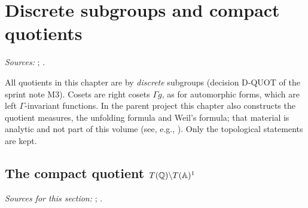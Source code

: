 
\chapter{Discrete subgroups and compact quotients}\label{ch:ch-0-07-quotient}

\noindent\emph{Sources:} \cite[§1]{AIntro}; \cite[§1]{A-R1}.

\noindent All quotients in this chapter are by \emph{discrete} subgroups (decision D-QUOT of the sprint note M3). Cosets are right
cosets $\Gamma g$, as for automorphic forms, which are left $\Gamma$-invariant functions. In the parent project this chapter also
constructs the quotient measures, the unfolding formula and Weil's formula; that material is analytic and not part of this volume
(see, e.g., \cite[§1]{AIntro}). Only the topological statements are kept.

\section{\texorpdfstring{The compact quotient $T(\mathbb{Q})\backslash T(\mathbb{A})^1$}{The compact quotient T(Q)\textbackslash T(A)1}}\label{sec:quot-compact}

\noindent\emph{Sources for this section:} \cite[§1]{AIntro}; \cite[§§1.4, 1.7]{GH}.


